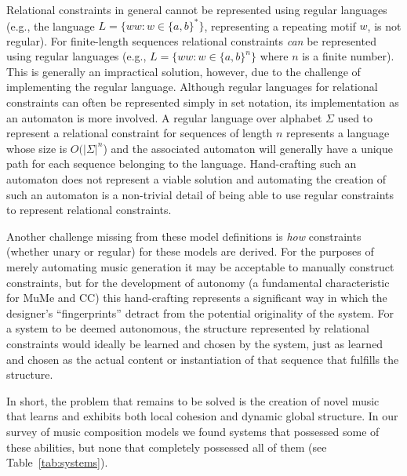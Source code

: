 \documentclass[phd,electronic,oneside,twosidetoc,letterpaper,chaptercenter,parttop,lof,lot]{byumsphd}
\begin{document}
Relational constraints in general cannot be represented using regular languages (e.g., the language $L=\{ww:w\in\{a,b\}^*\}$, representing a repeating motif $w$, is not regular). For finite-length sequences relational constraints \emph{can} be represented using regular languages (e.g., $L=\{ww:w\in\{a,b\}^n\}$ where $n$ is a finite number). This is generally an impractical solution, however, due to the challenge of implementing the regular language. Although regular languages for relational constraints can often be represented simply in set notation, its implementation as an automaton is more involved. A regular language over alphabet $\Sigma$ used to represent a relational constraint for sequences of length $n$ represents a language whose size is $O(|\Sigma |^n$) and the associated automaton will generally have a unique path for each sequence belonging to the language. Hand-crafting such an automaton does not represent a viable solution and automating the creation of such an automaton is a non-trivial detail of being able to use regular constraints to represent relational constraints.

Another challenge missing from these model definitions is \emph{how} constraints (whether unary or regular) for these models are derived. For the purposes of merely automating music generation it may be acceptable to manually construct constraints, but for the development of autonomy (a fundamental characteristic for MuMe and CC) this hand-crafting represents a significant way in which the designer's ``fingerprints'' detract from the potential originality of the system. For a system to be deemed autonomous, the structure represented by relational constraints would ideally be learned and chosen by the system, just as learned and chosen as the actual content or instantiation of that sequence that fulfills the structure.

In short, the problem that remains to be solved is the creation of novel music that learns and exhibits both local cohesion and dynamic global structure. In our survey of music composition models we found systems that possessed some of these abilities, but none that completely possessed all of them (see Table~\ref{tab:systems}).
\end{document}
